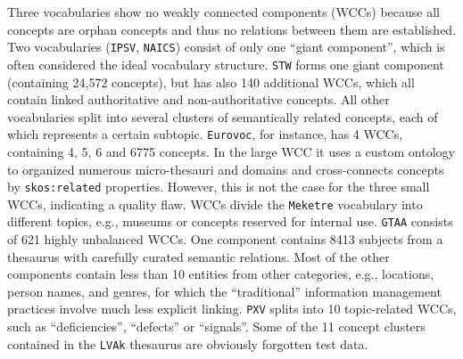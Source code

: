 
Three vocabularies show no weakly connected components (WCCs) because all concepts are orphan concepts and thus no relations between them are established. Two vocabularies (\texttt{IPSV}, \texttt{NAICS}) consist of only one ``giant component'', which is often considered the ideal vocabulary structure. \texttt{STW} forms one giant component (containing 24,572 concepts), but has also 140 additional WCCs, which all contain linked authoritative and non-authoritative concepts. All other vocabularies split into several clusters of semantically related concepts, each of which represents a certain subtopic. \texttt{Eurovoc}, for instance, has 4 WCCs, containing 4, 5, 6 and 6775 concepts. 
In the large WCC it uses a custom ontology to organized numerous micro-thesauri and domains and cross-connects concepts by \texttt{skos:related} properties. However, this is not the case for the three small WCCs, indicating a quality flaw. WCCs divide the \texttt{Meketre} vocabulary into different topics, e.g., museums or concepts reserved for internal use. \texttt{GTAA} consists of 621 highly unbalanced WCCs. One component contains 8413 subjects from a thesaurus with carefully curated semantic relations. Most of the other components contain less than 10 entities from other categories, e.g., locations, person names, and genres, for which the ``traditional'' information management practices involve much less explicit linking. \texttt{PXV} splits into 10 topic-related WCCs, such as ``deficiencies'', ``defects'' or ``signals''. Some of the 11 concept clusters contained in the \texttt{LVAk} thesaurus are obviously forgotten test data. 

